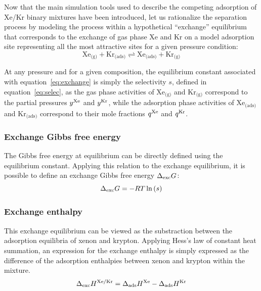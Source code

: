 \documentclass[main.tex]{subfiles}
\begin{document}
Now that the main simulation tools used to describe the competing adsorption of Xe/Kr binary mixtures have been introduced, let us rationalize the separation process by modeling the process within a hypothetical ``exchange'' equilibrium that corresponds to the exchange of gas phase Xe and Kr on a model adsorption site representing all the most attractive sites for a given pressure condition:
\begin{equation}\label{eq:exchange}
    \text{Xe}_{\text{(g)}} + \text{Kr}_{\text{(ads)}}
    \rightleftharpoons \text{Xe}_{\text{(ads)}} + \text{Kr}_{\text{(g)}}
\end{equation}

At any pressure and for a given composition, the equilibrium constant associated with equation~\ref{eq:exchange} is simply the selectivity $s$, defined in equation~\ref{eq:selec}, as the gas phase activities of $\text{Xe}_{\text{(g)}}$ and $\text{Kr}_{\text{(g)}}$ correspond to the partial pressures $y^{\text{Xe}}$ and $y^{\text{Kr}}$, while the adsorption phase activities of $\text{Xe}_{\text{(ads)}}$ and $\text{Kr}_{\text{(ads)}}$ correspond to their mole fractions $q^{\text{Xe}}$ and $q^{\text{Kr}}$. 

\subsubsection{Exchange Gibbs free energy}

The Gibbs free energy at equilibrium can be directly defined using the equilibrium constant. Applying this relation to the exchange equilibrium, it is possible to define an exchange Gibbs free energy $\Delta_{\text{exc}}G$:
\begin{equation}\label{eq:exc_gibbs_free_energy}
  \Delta_{\text{exc}}G = -RT \ln\left(s\right)
\end{equation}

\subsubsection{Exchange enthalpy}

This exchange equilibrium can be viewed as the substraction between the adsorption equilibria of xenon and krypton. Applying Hess's law of constant heat summation, an expression for the exchange enthalpy is simply expressed as the difference of the adsorption enthalpies between xenon and krypton within the mixture. 
\begin{equation}
  \Delta_{\text{exc}}H^{\text{Xe/Kr}} = \Delta_{\text{ads}}H^{\text{Xe}} - \Delta_{\text{ads}}H^{\text{Kr}}
\end{equation}
\end{document}
